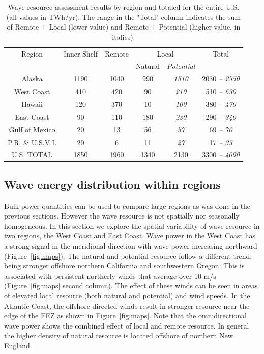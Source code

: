 \begin{table}[ht]
  \centering
  \begin{tabular}{|c|c|c|c|c|c|}
    \hline
    Region & Inner-Shelf & Remote & \multicolumn{2}{c|}{Local} & Total \\
    & & & Natural & {\it Potential} & \\
    \hline
    Alaska & 1190 & 1040 & 990 & {\it 1510} & 2030 {\it – 2550} \\
    West Coast & 410 & 420 & 90 & {\it 210} & 510 {\it – 630} \\
    Hawaii & 120 & 370 & 10 & {\it 100} & 380 {\it – 470} \\
    East Coast & 90 & 110 & 180 & {\it 230} & 290 {\it – 340} \\
    Gulf of Mexico & 20 & 13 & 56 & {\it 57} & 69 {\it – 70} \\
    P.R. \& U.S.V.I. & 20 & 6 & 11 & {\it 27} & 17 {\it – 33} \\
    \hline \hline
U.S. TOTAL & 1850 & 1960 & 1340 & 2130 & 3300 {\it – 4090} \\
\hline
  \end{tabular}
  \caption{Wave resource assessment results by region and totaled for the entire U.S. (all values in TWh/yr). The range in the "Total" column indicates the sum of Remote + Local (lower value) and Remote + Potential (higher value, in italics).
  }
  \label{table:totals}
\end{table}


\subsection{Wave energy distribution within regions}\label{sec:results:wc-dist}

Bulk power quantities can be used to compare large regions as was done in the previous sections. However the wave resource is not spatially nor seasonally homogeneous. In this section we explore the spatial variability of wave resource in two regions, the West Coast and East Coast. Wave power in the West Coast has a strong signal in the meridional direction with wave power increasing northward (Figure~\ref{fig:maps}).  The natural and potential resource follow a different trend, being stronger offshore northern California and southwestern Oregon. This is associated with persistent northerly winds that average over 10 m/s (Figure~\ref{fig:maps} second column). The effect of these winds can be seen in areas of elevated local resource (both natural and potential) and wind speeds. In the Atlantic Coast, the offshore directed winds result in stronger resource near the edge of the EEZ as shown in Figure~\ref{fig:maps}. Note that the omnidirectional wave power shows the combined effect of local and remote resource. In general the higher density of natural resource is located offshore of northern New England. 

